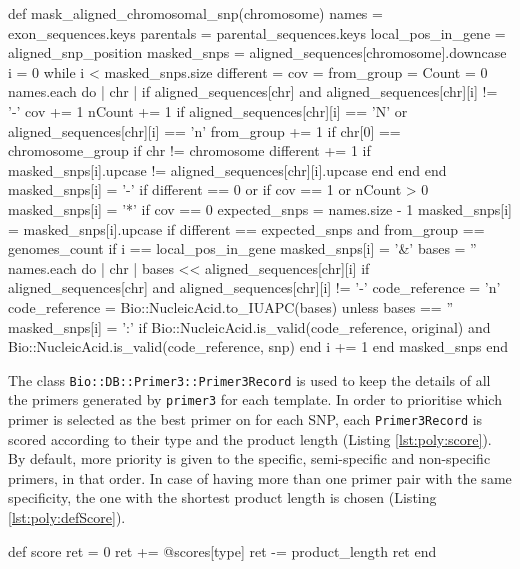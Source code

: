 \begin{code}[language=Ruby,caption={[\texttt{Bio::PolyploidTools::SNP.}\texttt{mask\_aligned\_chromosomal\_snp}] Method in \texttt{Bio::PolyploidTools::SNP} that calculates the mask of the alignment}, label=lst:poly:mask]
def mask_aligned_chromosomal_snp(chromosome)
  names = exon_sequences.keys
  parentals =  parental_sequences.keys
  local_pos_in_gene = aligned_snp_position
  masked_snps = aligned_sequences[chromosome].downcase
  i = 0
  while i < masked_snps.size
    different = cov = from_group = Count = 0
    names.each do | chr |
      if aligned_sequences[chr] and aligned_sequences[chr][i]  != '-'
        cov += 1 
        nCount += 1 if aligned_sequences[chr][i] == 'N' or  aligned_sequences[chr][i] == 'n' 
        from_group += 1 if chr[0] == chromosome_group
        if chr != chromosome 
          different += 1  if masked_snps[i].upcase != aligned_sequences[chr][i].upcase 
        end
      end
    end
    masked_snps[i] = '-' if different == 0 or if cov == 1 or nCount > 0
    masked_snps[i] = '*' if cov == 0
    expected_snps = names.size - 1 
    masked_snps[i] = masked_snps[i].upcase if different == expected_snps and from_group == genomes_count
    if i == local_pos_in_gene
      masked_snps[i] = '&'
      bases = ''
      names.each do | chr | { bases << aligned_sequences[chr][i]  if aligned_sequences[chr] and aligned_sequences[chr][i]  != '-' }
      code_reference = 'n'
      code_reference = Bio::NucleicAcid.to_IUAPC(bases) unless bases == ''
      masked_snps[i] = ':' if Bio::NucleicAcid.is_valid(code_reference,   original) and Bio::NucleicAcid.is_valid(code_reference,   snp)
    end
  i += 1
  end
  masked_snps
end
\end{code}

The class \texttt{Bio::DB::Primer3::Primer3Record} is used to keep the details of all the primers generated by \verb|primer3| for each template. 
In order to prioritise which primer is selected as the best primer on for each SNP, each \verb|Primer3Record| is scored according to their type and the product length (Listing \ref{lst:poly:score}).
By default, more priority is given to the specific, semi-specific and non-specific primers, in that order. 
In case of having more than one primer pair with the same specificity, the one with the shortest product length is chosen (Listing \ref{lst:poly:defScore}).  


\begin{code}[language=Ruby,caption={[\texttt{Bio::DB::Primer3::Primer3Record.score}]Method that calculates the score of a primer \texttt{Bio::DB::Primer3::Primer3Record}}, label=lst:poly:score]
def score
  ret = 0
  ret += @scores[type]
  ret -= product_length
  ret
end
\end{code}

